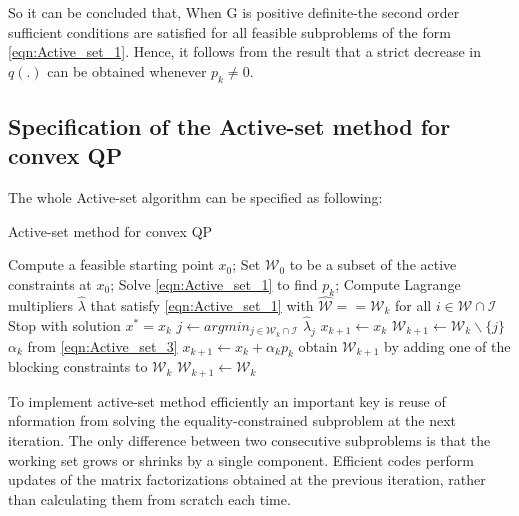 So it can be concluded that, When G is positive definite-the second order sufficient conditions are satisfied for all feasible subproblems of the form \ref{eqn:Active_set_1}. Hence, it follows from the result that a strict decrease in $q(.)$ can be obtained whenever $p_k \neq 0$.

\subsection*{Specification of the Active-set method for convex QP}
The whole Active-set algorithm can be specified as following:

\begin{algorithm}[h]
  \caption{Active-set method for convex QP}\label{euclid}
  \begin{algorithmic}[1]
      \State Compute a feasible starting point $x_0$;
      \State Set $\mathcal{W}_0$ to be a subset of the active constraints at $x_0$;
        \State Solve \ref{eqn:Active_set_1} to find $p_k$;
          \State Compute Lagrange multipliers $\hat{\lambda}$ that satisfy \ref{eqn:Active_set_1} with $\hat{\mathcal{W}}==\mathcal{W}_k$
           for all $i \in \mathcal{W}\cap \mathcal{I}$
          	\State Stop with solution $x^* = x_k$
          \Else
          	\State $j \gets argmin_{j\in \mathcal{W}_k \cap \mathcal{I}}$ $\hat{\lambda}_j$
          	\State $x_{k+1} \gets x_k$
          	\State $\mathcal{W}_{k+1} \gets \mathcal{W}_k\backslash \lbrace{j \rbrace}$
          \EndIf 
        \Else
          \State $\alpha_k$ from \ref{eqn:Active_set_3}
          \State $x_{k+1} \gets x_k + \alpha_kp_k$
          	\State obtain $\mathcal{W}_{k+1}$ by adding one of the blocking constraints to $\mathcal{W}_k$
          \Else
          	\State $\mathcal{W}_{k+1} \gets \mathcal{W}_k$  
          \EndIf
        \EndIf
      \EndFor
    \EndProcedure
  \end{algorithmic}
\end{algorithm}
To implement active-set method efficiently an important key is reuse of nformation from solving the equality-constrained subproblem at the next iteration. The only difference between two consecutive subproblems is that the working set grows or shrinks by a single component. Efficient codes perform updates of the matrix factorizations obtained at the previous iteration, rather than calculating them from scratch each time.



